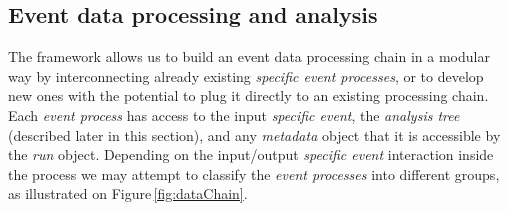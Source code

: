 
\subsection{Event data processing and analysis}

The framework allows us to build an event data processing chain in a modular way by interconnecting already existing \emph{specific event processes}, or to develop new ones with the potential to plug it directly to an existing processing chain. Each \emph{event process} has access to the input \emph{specific event}, the \emph{analysis tree} (described later in this section), and any \emph{metadata} object that it is accessible by the \emph{run} object. Depending on the input/output \emph{specific event} interaction inside the process we may attempt to classify the \emph{event processes} into different groups, as illustrated on Figure\,\ref{fig:dataChain}.



